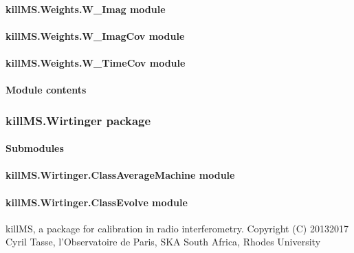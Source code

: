 \documentclass[letterpaper,10pt,english]{sphinxmanual}
\begin{document}
\paragraph{killMS.Weights.W\_Imag module}
\label{\detokenize{api/killMS.Weights:killms-weights-w-imag-module}}

\paragraph{killMS.Weights.W\_ImagCov module}
\label{\detokenize{api/killMS.Weights:killms-weights-w-imagcov-module}}

\paragraph{killMS.Weights.W\_TimeCov module}
\label{\detokenize{api/killMS.Weights:killms-weights-w-timecov-module}}

\paragraph{Module contents}
\label{\detokenize{api/killMS.Weights:module-killMS.Weights}}\label{\detokenize{api/killMS.Weights:module-contents}}
\sphinxstepscope


\subsubsection{killMS.Wirtinger package}
\label{\detokenize{api/killMS.Wirtinger:killms-wirtinger-package}}\label{\detokenize{api/killMS.Wirtinger::doc}}

\paragraph{Submodules}
\label{\detokenize{api/killMS.Wirtinger:submodules}}

\paragraph{killMS.Wirtinger.ClassAverageMachine module}
\label{\detokenize{api/killMS.Wirtinger:killms-wirtinger-classaveragemachine-module}}

\paragraph{killMS.Wirtinger.ClassEvolve module}
\label{\detokenize{api/killMS.Wirtinger:module-killMS.Wirtinger.ClassEvolve}}\label{\detokenize{api/killMS.Wirtinger:killms-wirtinger-classevolve-module}}
\sphinxAtStartPar
killMS, a package for calibration in radio interferometry.
Copyright (C) 2013\sphinxhyphen{}2017  Cyril Tasse, l’Observatoire de Paris,
SKA South Africa, Rhodes University
\end{document}
